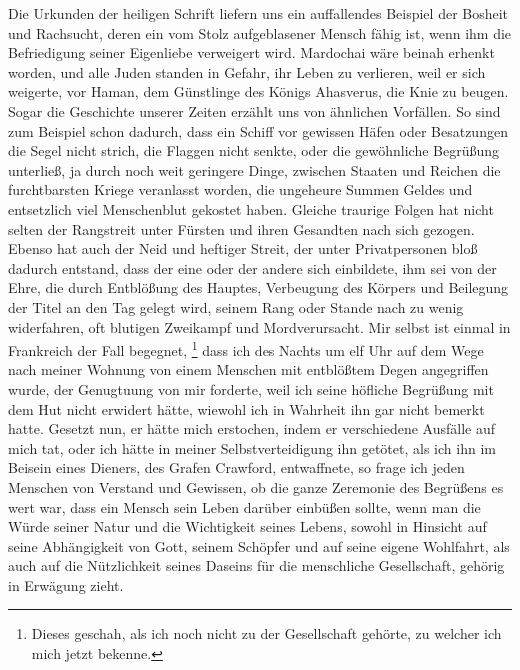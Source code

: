 Die Urkunden der heiligen Schrift liefern uns ein auffallendes Beispiel der
Bosheit und Rachsucht, deren ein vom Stolz aufgeblasener Mensch fähig ist, wenn
ihm die Befriedigung seiner Eigenliebe verweigert wird.
Mardochai wäre beinah
erhenkt worden, und alle Juden standen in Gefahr, ihr Leben zu verlieren, weil
er sich weigerte, vor Haman, dem Günstlinge des Königs
Ahasverus, die Knie zu
beugen. Sogar die Geschichte unserer Zeiten erzählt uns von
ähnlichen Vorfällen.
So sind zum Beispiel schon dadurch, dass ein Schiff vor gewissen Häfen oder Besatzungen
die Segel nicht strich, die Flaggen nicht senkte, oder die gewöhnliche
Begrüßung
unterließ, ja durch noch weit geringere Dinge, zwischen Staaten und Reichen die
furchtbarsten Kriege veranlasst worden, die ungeheure Summen Geldes
und
entsetzlich viel Menschenblut gekostet haben. Gleiche traurige Folgen hat nicht
selten der Rangstreit unter Fürsten und ihren Gesandten nach sich gezogen.
Ebenso
hat auch der Neid und heftiger Streit, der unter Privatpersonen bloß dadurch
entstand, dass der eine oder der andere sich einbildete, ihm sei von der Ehre,
die durch Entblößung des Hauptes,
Verbeugung des Körpers und Beilegung der Titel
an den Tag gelegt wird, seinem Rang oder Stande nach zu wenig widerfahren, oft
blutigen Zweikampf und Mordverursacht. Mir selbst ist einmal
in Frankreich
der Fall begegnet, \label{kap9_ab2_duell_penn}\footnote{Dieses geschah, als ich
noch nicht zu der
Gesellschaft gehörte, zu welcher ich mich jetzt bekenne.}
 dass ich des Nachts um
elf Uhr auf dem Wege nach meiner Wohnung von einem Menschen mit entblößtem Degen
angegriffen wurde, der Genugtuung von mir forderte, weil ich
seine höfliche
Begrüßung mit dem Hut nicht erwidert hätte, wiewohl ich in
Wahrheit ihn gar
nicht bemerkt hatte. Gesetzt nun, er hätte mich erstochen, indem er verschiedene
Ausfälle auf mich tat, oder ich hätte in meiner Selbstverteidigung ihn
getötet, als ich ihn im Beisein eines Dieners, des Grafen
Crawford,
entwaffnete, so frage ich jeden Menschen von Verstand und Gewissen, ob die ganze
Zeremonie des Begrüßens es wert war, dass ein Mensch sein Leben darüber einbüßen
sollte, wenn man die Würde seiner Natur und die Wichtigkeit seines Lebens,
sowohl in Hinsicht auf seine Abhängigkeit von Gott, seinem Schöpfer und auf
seine eigene Wohlfahrt, als auch auf die Nützlichkeit seines Daseins für die
menschliche Gesellschaft, gehörig in Erwägung zieht.


